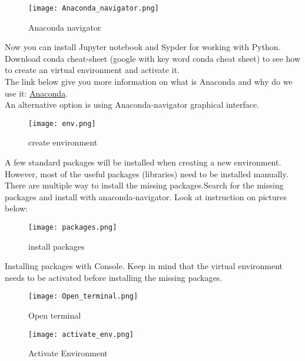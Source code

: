 \documentclass[a4paper,10pt]{article}
\begin{document}
\begin{figure}[H]
\centering
\texttt{[image: Anaconda\_navigator.png]}
\caption[Short title]{Anaconda navigator}
\label{fig:ff1}\end{figure}

\vspace{5mm}

Now you can install Jupyter notebook and Sypder for working with Python.\\
Download conda cheat-sheet (google with key word conda cheat sheet) to see how to create an virtual environment and activate it.\\
The link below give you more information on what is Anaconda and why do we use it:
\href{https://protostar.space/why-you-need-python-environments-and-how-to-manage-them-with-conda}{Anaconda}.\\
An alternative option is using Anaconda-navigator graphical interface.


\begin{figure}[H]
\centering\texttt{[image: env.png]}
\caption[Short title]{create environment}
\label{fig:ff2}\end{figure}


A few standard packages will be installed when creating a new environment. However, most of the useful packages (libraries) need to be installed manually.\\   
There are multiple way to install the missing packages.Search for the missing packages and install with anaconda-navigator. Look at instruction on pictures below:

\vspace{5mm}
\begin{figure}[H]
\centering\texttt{[image: packages.png]}
\caption[Short title]{install packages}
\label{fig:ff3}\end{figure}

\newpage

Installing packages with Console. Keep in mind that the virtual environment needs to be activated before installing the missing packages.

\begin{figure}[H]
\centering\texttt{[image: Open\_terminal.png]}
\caption[Short title]{Open terminal}
\label{fig:ff4}\end{figure}

\begin{figure}[H]
\centering\texttt{[image: activate\_env.png]}
\caption[Short title]{Activate Environment}
\label{fig:ff5}\end{figure}
\end{document}
